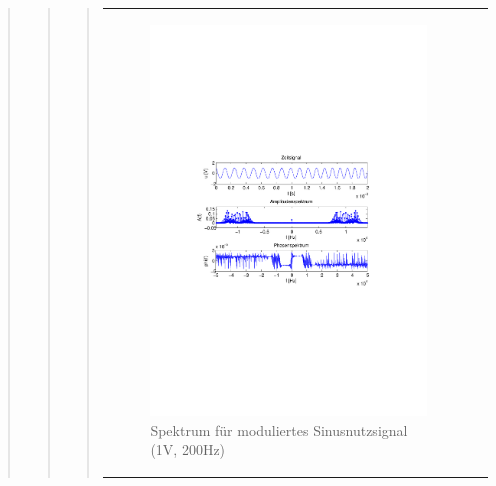 \begin{quote}
\begin{quote}
\begin{quote}
\begin{center}
\begin{tabular}{ll}
\begin{minipage}{0.6\textwidth}
                \end{minipage}
                \begin{minipage}{0.6\textwidth}

                     \begin{figure}[H]
                        \label{fig:}
                        \includegraphics[scale=0.5, trim = 4cm 9.5cm 3.5cm
                        9.5cm, clip]{./Bilder/sin_a1_f200}
                        \caption{Spektrum für moduliertes Sinusnutzsignal (1V,
                        200Hz)}
                    \end{figure}
               \vspace{-1.5em}

                \end{minipage}


\end{tabular}
\end{center}
\end{quote}
\end{quote}
\end{quote}
